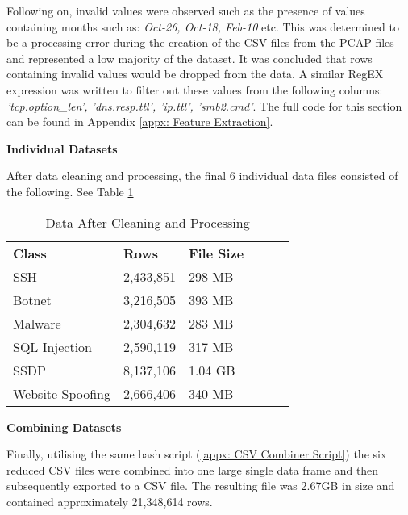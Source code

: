 \smallskip
Following on, invalid values were observed such as the presence of values containing months such as: \textit{Oct-26, Oct-18, Feb-10} etc. This was determined to be a processing error during the creation of the CSV files from the PCAP files and represented a low majority of the dataset. It was concluded that rows containing invalid values would be dropped from the data. A similar RegEX expression was written to filter out these values from the following columns: \textit{'tcp.option\_len', 'dns.resp.ttl', 'ip.ttl', 'smb2.cmd'}. The full code for this section can be found in Appendix \ref{appx: Feature Extraction}.

\medskip

\textbf{Individual Datasets}

\smallskip
After data cleaning and processing, the final 6 individual data files consisted of the following. See Table \ref{tab:reduced_data}

\begin{table}[H]
\centering
\begin{tabular}{llllll}
\cline{1-3}
\textbf{Class}  & \textbf{Rows} & \textbf{File Size} &  &  &  \\ \cline{1-3}
SSH              & 2,433,851    & 298 MB               &  &  &  \\
Botnet           & 3,216,505     & 393 MB             &  &  &  \\
Malware          & 2,304,632     & 283 MB             &  &  &  \\
SQL Injection    & 2,590,119     & 317 MB             &  &  &  \\
SSDP             & 8,137,106     & 1.04 GB            &  &  &  \\
Website Spoofing & 2,666,406     & 340 MB            &  &  &  \\ \cline{1-3}
\end{tabular}
\caption{Data After Cleaning and Processing}
\label{tab:reduced_data}
\end{table}

\medskip

\textbf{Combining Datasets}

\smallskip
Finally, utilising the same bash script (\ref{appx: CSV Combiner Script}) the six reduced CSV files were combined into one large single data frame and then subsequently exported to a CSV file. The resulting file was 2.67GB in size and contained approximately 21,348,614 rows. 